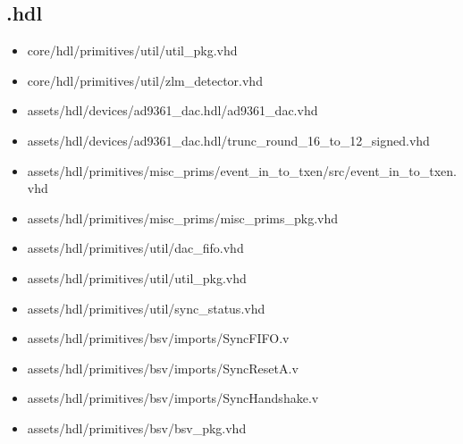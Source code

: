 \subsection*{\comp.hdl}
\begin{itemize}
	\item core/hdl/primitives/util/util\_pkg.vhd
	\item core/hdl/primitives/util/zlm\_detector.vhd
	\item assets/hdl/devices/ad9361\_dac.hdl/ad9361\_dac.vhd
	\item assets/hdl/devices/ad9361\_dac.hdl/trunc\_round\_16\_to\_12\_signed.vhd
	\item assets/hdl/primitives/misc\_prims/event\_in\_to\_txen/src/event\_in\_to\_txen.vhd
	\item assets/hdl/primitives/misc\_prims/misc\_prims\_pkg.vhd
	\item assets/hdl/primitives/util/dac\_fifo.vhd
	\item assets/hdl/primitives/util/util\_pkg.vhd
	\item assets/hdl/primitives/util/sync\_status.vhd
	\item assets/hdl/primitives/bsv/imports/SyncFIFO.v
	\item assets/hdl/primitives/bsv/imports/SyncResetA.v
	\item assets/hdl/primitives/bsv/imports/SyncHandshake.v
	\item assets/hdl/primitives/bsv/bsv\_pkg.vhd
\end{itemize}
